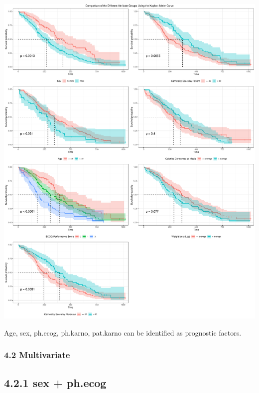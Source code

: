 \documentclass[
]{article}
\begin{document}
\includegraphics{final_project_files/figure-latex/unnamed-chunk-22-1.pdf}

Age, sex, ph.ecog, ph.karno, pat.karno can be identified as prognostic
factors.

\hypertarget{multivariate}{%
\subsubsection{4.2 Multivariate}\label{multivariate}}

\hypertarget{sex-ph.ecog}{%
\subsection{4.2.1 sex + ph.ecog}\label{sex-ph.ecog}}
\end{document}
